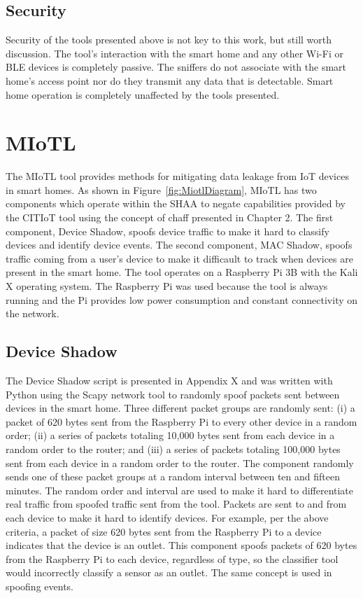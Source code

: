 \documentclass[12pt,letterpaper,oneside]{book}
\begin{document}
			\figNetworkMap
		
			\subsection{Security}
			Security of the tools presented above is not key to this work, but still worth discussion. The tool's interaction with the smart home and any other Wi-Fi or \ac{BLE} devices is completely passive. The sniffers do not associate with the smart home's access point nor do they transmit any data that is detectable. Smart home operation is completely unaffected by the tools presented.
		
		\section{\acf{MIoTL}}
		The \ac{MIoTL} tool provides methods for mitigating data leakage from \ac{IoT} devices in smart homes. As shown in Figure~\ref{fig:MiotlDiagram}, \ac{MIoTL} has two components which operate within the \ac{SHAA} to negate capabilities provided by the \ac{CITIoT} tool using the concept of chaff presented in Chapter 2. The first component, Device Shadow, spoofs device traffic to make it hard to classify devices and identify device events. The second component, MAC Shadow, spoofs traffic coming from a user's device to make it difficault to track when devices are present in the smart home. The tool operates on a Raspberry Pi 3B with the Kali X operating system. The Raspberry Pi was used because the tool is always running and the Pi provides low power consumption and constant connectivity on the network.
		\figMiotlDiagram
		
			\subsection{Device Shadow}
			The Device Shadow script is presented in Appendix X and was written with Python using the Scapy network tool to randomly spoof packets sent between devices in the smart home. Three different packet groups are randomly sent: (i) a packet of 620 bytes sent from the Raspberry Pi to every other device in a random order; (ii) a series of packets totaling 10,000 bytes sent from each device in a random order to the router; and (iii) a series of packets totaling 100,000 bytes sent from each device in a random order to the router. The component randomly sends one of these packet groups at a random interval between ten and fifteen minutes. The random order and interval are used to make it hard to differentiate real traffic from spoofed traffic sent from the tool. Packets are sent to and from each device to make it hard to identify devices. For example, per the above criteria, a packet of size 620 bytes sent from the Raspberry Pi to a device indicates that the device is an outlet. This component spoofs packets of 620 bytes from the Raspberry Pi to each device, regardless of type, so the classifier tool would incorrectly classify a sensor as an outlet. The same concept is used in spoofing events.
			
\end{document}
